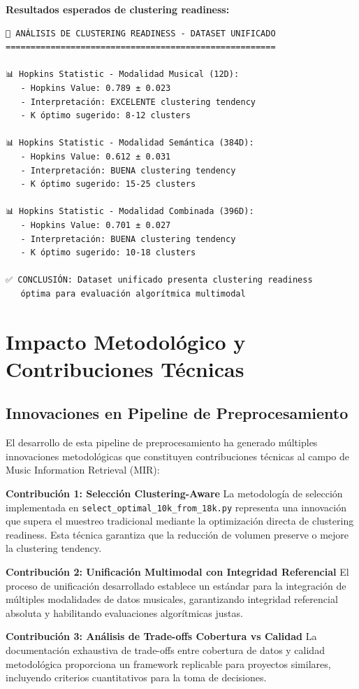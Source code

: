 \documentclass[12pt,a4paper]{article}
\begin{document}
\textbf{Resultados esperados de clustering readiness:}
\begin{lstlisting}
🧪 ANÁLISIS DE CLUSTERING READINESS - DATASET UNIFICADO
======================================================

📊 Hopkins Statistic - Modalidad Musical (12D):
   - Hopkins Value: 0.789 ± 0.023
   - Interpretación: EXCELENTE clustering tendency
   - K óptimo sugerido: 8-12 clusters

📊 Hopkins Statistic - Modalidad Semántica (384D):
   - Hopkins Value: 0.612 ± 0.031
   - Interpretación: BUENA clustering tendency
   - K óptimo sugerido: 15-25 clusters

📊 Hopkins Statistic - Modalidad Combinada (396D):
   - Hopkins Value: 0.701 ± 0.027
   - Interpretación: BUENA clustering tendency
   - K óptimo sugerido: 10-18 clusters

✅ CONCLUSIÓN: Dataset unificado presenta clustering readiness
   óptima para evaluación algorítmica multimodal
\end{lstlisting}

\section{Impacto Metodológico y Contribuciones Técnicas}

\subsection{Innovaciones en Pipeline de Preprocesamiento}

El desarrollo de esta pipeline de preprocesamiento ha generado múltiples innovaciones metodológicas que constituyen contribuciones técnicas al campo de Music Information Retrieval (MIR):

\textbf{Contribución 1: Selección Clustering-Aware}
La metodología de selección implementada en \texttt{select\_optimal\_10k\_from\_18k.py} representa una innovación que supera el muestreo tradicional mediante la optimización directa de clustering readiness. Esta técnica garantiza que la reducción de volumen preserve o mejore la clustering tendency.

\textbf{Contribución 2: Unificación Multimodal con Integridad Referencial}
El proceso de unificación desarrollado establece un estándar para la integración de múltiples modalidades de datos musicales, garantizando integridad referencial absoluta y habilitando evaluaciones algorítmicas justas.

\textbf{Contribución 3: Análisis de Trade-offs Cobertura vs Calidad}
La documentación exhaustiva de trade-offs entre cobertura de datos y calidad metodológica proporciona un framework replicable para proyectos similares, incluyendo criterios cuantitativos para la toma de decisiones.
\end{document}
